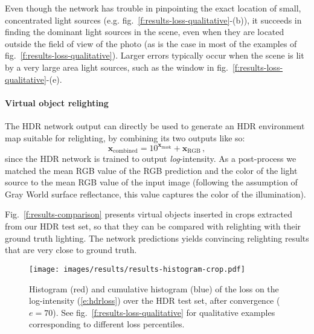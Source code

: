 Even though the network has trouble in pinpointing the exact location of small, concentrated light sources (e.g. fig.~\ref{f:results-loss-qualitative}-(b)), it succeeds in finding the dominant light sources in the scene, even when they are located outside the field of view of the photo (as is the case in most of the examples of fig.~\ref{f:results-loss-qualitative}). Larger errors typically occur when the scene is lit by a very large area light sources, such as the window in fig.~\ref{f:results-loss-qualitative}-(e). 


\paragraph{Virtual object relighting} 

The HDR network output can directly be used to generate an HDR environment map suitable for relighting, by combining its two outputs like so: 
%
\begin{equation}
\mathbf{x}_\text{combined} = 10^{\mathbf{x}_\text{mask}} + \mathbf{x}_\text{RGB} \,,
\label{e:hdr-envmap}
\end{equation}
%
since the HDR network is trained to output \emph{log}-intensity. As a post-process we matched the mean RGB value of the RGB prediction and the color of the light source to the mean RGB value of the input image (following the assumption of Gray World surface reflectance, this value captures the color of the illumination).

Fig.~\ref{f:results-comparison} presents virtual objects inserted in crops extracted from our HDR test set, so that they can be compared with relighting with their ground truth lighting. The network predictions yields convincing relighting results that are very close to ground truth.

\begin{figure}[!t]
\centering 
\texttt{[image: images/results/results-histogram-crop.pdf]}
\caption{Histogram (red) and cumulative histogram (blue) of the loss on the log-intensity (\ref{e:hdrloss}) over the HDR test set, after convergence ($e = 70$). See fig.~\ref{f:results-loss-qualitative} for qualitative examples corresponding to different loss percentiles.}
\label{f:results-loss-histogram}
\end{figure}

